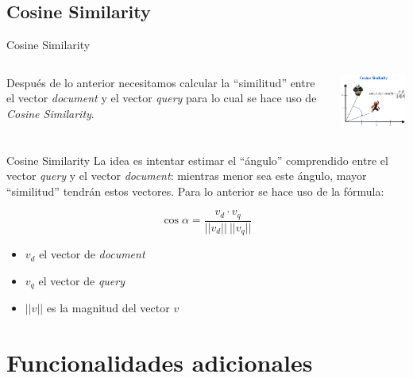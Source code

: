 \documentclass{beamer}
\begin{document}
\subsection*{Cosine Similarity}

\begin{frame}{Cosine Similarity}
  \begin{columns}[T]
    \begin{column}[T]{6cm}
      Después de lo anterior necesitamos calcular la ``similitud'' entre el
      vector {\it document} y el vector {\it query} para lo cual se hace uso de {\it
          Cosine Similarity}.
    \end{column}
    \begin{column}[T]{5cm}
      \includegraphics[width=5cm]{images/cosine.png}
    \end{column}
  \end{columns}
\end{frame}

\begin{frame}{Cosine Similarity}
  La idea es intentar estimar el ``ángulo'' comprendido entre
  el vector {\it query} y el vector {\it document}: mientras menor sea este
  ángulo, mayor ``similitud'' tendrán estos vectores. Para lo anterior se hace
  uso de la fórmula:

  \begin{equation}
    \cos \alpha = \frac{v_d \cdot v_q}{||v_d|| ~ ||v_q||} \nonumber
  \end{equation}

  \begin{itemize}
    \item $v_d$ el vector de {\it document}
    \item $v_q$ el vector de {\it query}
    \item $||v||$ es la magnitud del vector $v$
  \end{itemize}
\end{frame}

\section{Funcionalidades adicionales}
\end{document}
